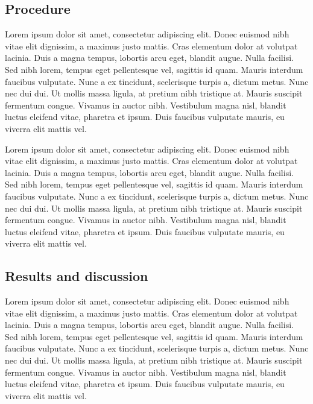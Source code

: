 \documentclass{article}
\begin{document}
\subsection{Procedure}
Lorem ipsum dolor sit amet, consectetur adipiscing elit.
Donec euismod nibh vitae elit dignissim, a maximus justo mattis.
Cras elementum dolor at volutpat lacinia.
Duis a magna tempus, lobortis arcu eget, blandit augue.
Nulla facilisi.
Sed nibh lorem, tempus eget pellentesque vel, sagittis id quam.
Mauris interdum faucibus vulputate.
Nunc a ex tincidunt, scelerisque turpis a, dictum metus.
Nunc nec dui dui.
Ut mollis massa ligula, at pretium nibh tristique at.
Mauris suscipit fermentum congue.
Vivamus in auctor nibh.
Vestibulum magna nisl, blandit luctus eleifend vitae, pharetra et ipsum.
Duis faucibus vulputate mauris, eu viverra elit mattis vel.

Lorem ipsum dolor sit amet, consectetur adipiscing elit.
Donec euismod nibh vitae elit dignissim, a maximus justo mattis.
Cras elementum dolor at volutpat lacinia.
Duis a magna tempus, lobortis arcu eget, blandit augue.
Nulla facilisi.
Sed nibh lorem, tempus eget pellentesque vel, sagittis id quam.
Mauris interdum faucibus vulputate.
Nunc a ex tincidunt, scelerisque turpis a, dictum metus.
Nunc nec dui dui.
Ut mollis massa ligula, at pretium nibh tristique at.
Mauris suscipit fermentum congue.
Vivamus in auctor nibh.
Vestibulum magna nisl, blandit luctus eleifend vitae, pharetra et ipsum.
Duis faucibus vulputate mauris, eu viverra elit mattis vel.



\subsection{Results and discussion}
Lorem ipsum dolor sit amet, consectetur adipiscing elit.
Donec euismod nibh vitae elit dignissim, a maximus justo mattis.
Cras elementum dolor at volutpat lacinia.
Duis a magna tempus, lobortis arcu eget, blandit augue.
Nulla facilisi.
Sed nibh lorem, tempus eget pellentesque vel, sagittis id quam.
Mauris interdum faucibus vulputate.
Nunc a ex tincidunt, scelerisque turpis a, dictum metus.
Nunc nec dui dui.
Ut mollis massa ligula, at pretium nibh tristique at.
Mauris suscipit fermentum congue.
Vivamus in auctor nibh.
Vestibulum magna nisl, blandit luctus eleifend vitae, pharetra et ipsum.
Duis faucibus vulputate mauris, eu viverra elit mattis vel.
\end{document}
